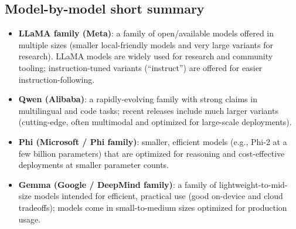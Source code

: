 \documentclass[a4paper, 12pt]{article}
\begin{document}
\subsection*{Model-by-model short summary}
\begin{itemize}
  \item \textbf{LLaMA family (Meta)}: a family of open/available models offered in multiple sizes (smaller local-friendly models and very large variants for research). LLaMA models are widely used for research and community tooling; instruction-tuned variants (``instruct'') are offered for easier instruction-following. 
  \item \textbf{Qwen (Alibaba)}: a rapidly-evolving family with strong claims in multilingual and code tasks; recent releases include much larger variants (cutting-edge, often multimodal and optimized for large-scale deployments).
  \item \textbf{Phi (Microsoft / Phi family)}: smaller, efficient models (e.g., Phi-2 at a few billion parameters) that are optimized for reasoning and cost-effective deployments at smaller parameter counts.
  \item \textbf{Gemma (Google / DeepMind family)}: a family of lightweight-to-mid-size models intended for efficient, practical use (good on-device and cloud tradeoffs); models come in small-to-medium sizes optimized for production usage.
\end{itemize}
\end{document}
